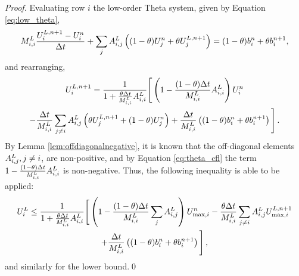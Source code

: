 \begin{proof}
Evaluating row $i$ the low-order Theta system, given by Equation
\eqref{eq:low_theta},
\[
  M^L_{i,i}\frac{U_i^{L,n+1}-U_i^n}
    {\Delta t} + \sum\limits_jA_{i,j}^L \left((1-\theta)
     U_j^n
  + \theta U_j^{L,n+1}\right)
  = (1-\theta)b_i^n + \theta b_i^{n+1},
\]
and rearranging,
\begin{multline*}
   U_i^{L,n+1}
   = \frac{1}{1+\frac{\theta\Delta t}{M^L_{i,i}}
       A_{i,i}^L}
     \Bigg[\left(1 - \frac{(1-\theta)\Delta t}{M^L_{i,i}}
     A_{i,i}^L\right)U_i^n
     \\
     - \frac{\Delta t}{M^L_{i,i}}\sum\limits_{j\ne i}
       A_{i,j}^L
     \left(\theta U_j^{L,n+1} + (1-\theta)U_j^n\right)
     + \frac{\Delta t}{M^L_{i,i}}
       \left((1-\theta)b_i^n + \theta b_i^{n+1}\right)\Bigg] \,.
\end{multline*}
By Lemma \ref{lem:offdiagonalnegative}, it is known that the off-diagonal
elements $A^L_{i,j}, j\ne i$, are non-positive, and by Equation
\eqref{eq:theta_cfl} the term $1 -
\frac{(1-\theta)\Delta t}{M^L_{i,i}}A_{i,i}^L$
is non-negative. Thus, the following inequality is able to be applied:
\begin{multline*}
   U_i^L
   \le \frac{1}{1+\frac{\theta\Delta t}{M^L_{i,i}}
     A_{i,i}^L}
     \Bigg[\left(1 - \frac{(1-\theta)\Delta t}{M^L_{i,i}}
       \sum\limits_jA_{i,j}^L\right)U_{\max,i}^n
       - \frac{\theta\Delta t}{M^L_{i,i}}
         \sum\limits_{j\ne i}A_{i,j}^L U_{\max,i}^{L,n+1}
     \\
       + \frac{\Delta t}{M^L_{i,i}}
         \left((1-\theta)b_i^n + \theta b_i^{n+1}\right)\Bigg] \,,
\end{multline*}
and similarly for the lower bound.\qed
\end{proof}
